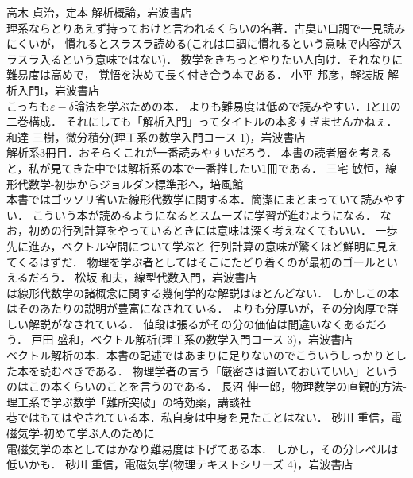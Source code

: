 \begin{thebibliography}{99}
  高木 貞治，定本 解析概論，岩波書店 \\
理系ならとりあえず持っておけと言われるくらいの名著．古臭い口調で一見読みにくいが，
慣れるとスラスラ読める(これは口調に慣れるという意味で内容がスラスラ入るという意味ではない)．
数学をきちっとやりたい人向け．それなりに難易度は高めで，
覚悟を決めて長く付き合う本である．
 小平 邦彦，軽装版 解析入門I，岩波書店 \\
こっちも$\varepsilon-\delta$論法を学ぶための本．
\cite{takagi}よりも難易度は低めで読みやすい．IとI\hspace{-.1em}Iの二巻構成．
それにしても「解析入門」ってタイトルの本多すぎませんかねぇ．
和達 三樹，微分積分(理工系の数学入門コース 1)，岩波書店 \\
解析系3冊目．おそらくこれが一番読みやすいだろう．
本書の読者層を考えると，私が見てきた中では解析系の本で一番推したい1冊である． 
  三宅 敏恒，線形代数学-初歩からジョルダン標準形へ，培風館 \\
本書ではゴッソリ省いた線形代数学に関する本．簡潔にまとまっていて読みやすい．
こういう本が読めるようになるとスムーズに学習が進むようになる．
なお，初めの行列計算をやっているときには意味は深く考えなくてもいい．
一歩先に進み，ベクトル空間について学ぶと
行列計算の意味が驚くほど鮮明に見えてくるはずだ．
物理を学ぶ者としてはそこにたどり着くのが最初のゴールといえるだろう．
 松坂 和夫，線型代数入門，岩波書店 \\
\cite{liner}は線形代数学の諸概念に関する幾何学的な解説はほとんどない．
しかしこの本はそのあたりの説明が豊富になされている．
\cite{liner}よりも分厚いが，その分肉厚で詳しい解説がなされている．
値段は張るがその分の価値は間違いなくあるだろう．
  戸田 盛和，ベクトル解析(理工系の数学入門コース 3)，岩波書店 \\
ベクトル解析の本．本書の記述ではあまりに足りないのでこういうしっかりとした本を読むべきである．
物理学者の言う「厳密さは置いておいていい」というのはこの本くらいのことを言うのである．
  長沼 伸一郎，物理数学の直観的方法-理工系で学ぶ数学「難所突破」の特効薬，講談社 \\
巷ではもてはやされている本．私自身は中身を見たことはない． 
  砂川 重信，電磁気学-初めて学ぶ人のために \\
電磁気学の本としてはかなり難易度は下げてある本．
しかし，その分レベルは低いかも．
   砂川 重信，電磁気学(物理テキストシリーズ 4)，岩波書店 \\

\end{thebibliography}
